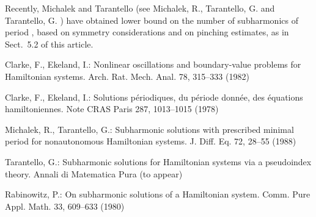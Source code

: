 \documentclass{llncs}
\begin{document}
Recently, Michalek and Tarantello (see Michalek, R., Tarantello, G.
\cite{2mich:tar} and Tarantello, G. \cite{2tar}) have obtained lower
bound on the number of subharmonics of period , based on symmetry
considerations and on pinching estimates, as in Sect.~5.2 of this
article.

\begin{thebibliography}{}
Clarke, F., Ekeland, I.:
Nonlinear oscillations and
boundary-value problems for Hamiltonian systems.
Arch. Rat. Mech. Anal. 78, 315--333 (1982)

Clarke, F., Ekeland, I.:
Solutions p\'{e}riodiques, du
p\'{e}riode donn\'{e}e, des \'{e}quations hamiltoniennes.
Note CRAS Paris 287, 1013--1015 (1978)

Michalek, R., Tarantello, G.:
Subharmonic solutions with prescribed minimal
period for nonautonomous Hamiltonian systems.
J. Diff. Eq. 72, 28--55 (1988)

Tarantello, G.:
Subharmonic solutions for Hamiltonian
systems via a  pseudoindex theory.
Annali di Matematica Pura (to appear)

Rabinowitz, P.:
On subharmonic solutions of a Hamiltonian system.
Comm. Pure Appl. Math. 33, 609--633 (1980)

\end{thebibliography}
\clearpage
{} \renewcommand{\indexname}{Author Index}
\printindex
\clearpage
{} 
\renewcommand{\indexname}{Subject Index}

\end{document}
